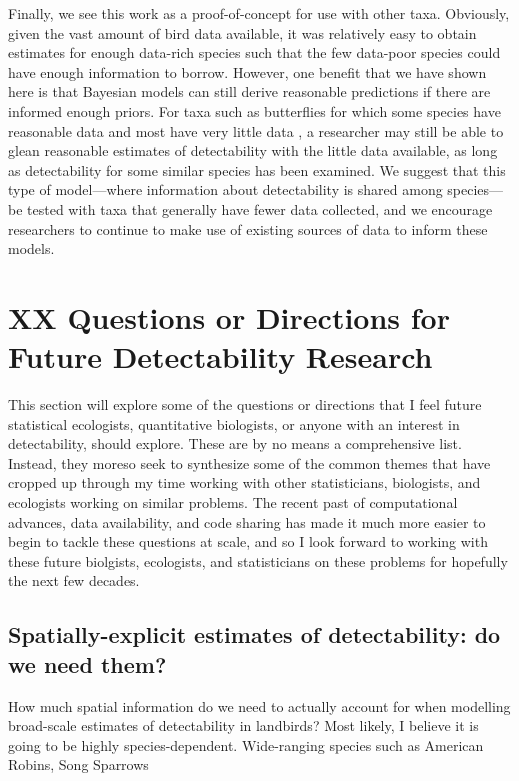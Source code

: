 \par Finally, we see this work as a proof-of-concept for use with other taxa.
Obviously, given the vast amount of bird data available, it was relatively easy to obtain estimates for enough data-rich species such that the few data-poor species could have enough information to borrow. 
However, one benefit that we have shown here is that Bayesian models can still derive reasonable predictions if there are informed enough priors.
For taxa such as butterflies for which some species have reasonable data and most have very little data \citep{lewthwaite_geographical_2022}, a researcher may still be able to glean reasonable estimates of detectability with the little data available, as long as detectability for some similar species has been examined.
We suggest that this type of model---where information about detectability is shared among species---be tested with taxa that generally have fewer data collected, and we encourage researchers to continue to make use of existing sources of data \citep{binley_minimizing_2023} to inform these models.

\section{XX Questions or Directions for Future Detectability Research}

\par This section will explore some of the questions or directions that I feel future statistical ecologists, quantitative biologists, or anyone with an interest in detectability, should explore.
These are by no means a comprehensive list.
Instead, they moreso seek to synthesize some of the common themes that have cropped up through my time working with other statisticians, biologists, and ecologists working on similar problems.
The recent past of computational advances, data availability, and code sharing has made it much more easier to begin to tackle these questions at scale, and so I look forward to working with these future biolgists, ecologists, and statisticians on these problems for hopefully the next few decades.

\subsection{Spatially-explicit estimates of detectability: do we need them?}

\par How much spatial information do we need to actually account for when modelling broad-scale estimates of detectability in landbirds?
Most likely, I believe it is going to be highly species-dependent.
Wide-ranging species such as American Robins, Song Sparrows

